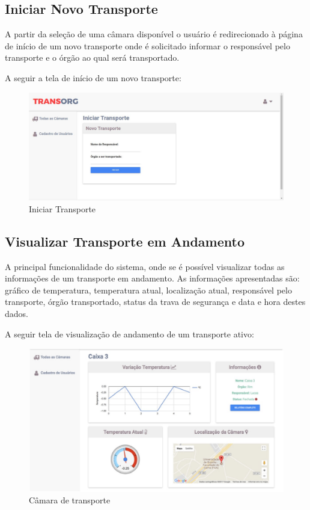 \subsection{Iniciar Novo Transporte}
	A partir da seleção de uma câmara disponível o usuário é redirecionado à página de início de um novo transporte onde é solicitado informar o responsável pelo transporte e o órgão ao qual será transportado.
	
	A seguir a tela de início de um novo transporte:

\begin{figure}[H]
\centering
\includegraphics[width=16cm]{figuras/iniciarTransporte_software.JPG}
\caption{Iniciar Transporte}
\end{figure}

\subsection{Visualizar Transporte em Andamento}
	A principal funcionalidade do sistema, onde se é possível visualizar todas as informações de um transporte em andamento. As informações apresentadas são: gráfico de temperatura, temperatura atual, localização atual, responsável pelo transporte, órgão transportado, status da trava de segurança e data e hora destes dados.

	A seguir tela de visualização de andamento de um transporte ativo:

\begin{figure}[H]
\centering
\includegraphics[width=16cm]{figuras/camara_software.jpg}
\caption{Câmara de transporte}
\end{figure}

